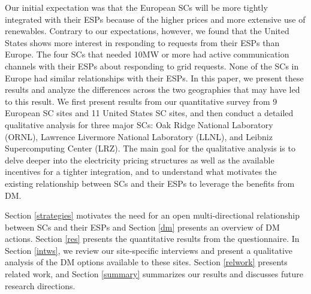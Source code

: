 Our initial expectation was that the European SCs will be more tightly integrated with their ESPs because of the higher prices and more extensive use of renewables.  Contrary to our expectations, however, we found that the United States shows more interest in responding to requests from their ESPs than Europe. The four SCs that needed 10MW or more had active communication channels with their ESPs about responding to grid requests.  None of the SCs in Europe had similar relationships with their ESPs. In this paper, we present these results and analyze the differences across the two geographies that may have led to this result. We first present results from our quantitative survey from 9 European SC sites and 11 United States SC sites, and then conduct a detailed qualitative analysis for three major SCs: Oak Ridge National Laboratory (ORNL), Lawrence Livermore National Laboratory (LLNL), and Leibniz Supercomputing Center (LRZ). The main goal for the qualitative analysis is to delve deeper into the electricity pricing structures as well as the available incentives for a tighter integration, and to understand what motivates the existing relationship between SCs and their ESPs to leverage the benefits from DM. 

Section \ref{strategies} motivates the need for an open multi-directional relationship between SCs and their ESPs and Section \ref{dm} presents an overview of DM actions. Section \ref{res} presents the quantitative results from the questionnaire. In Section \ref{intws}, we review our site-specific interviews and present a qualitative analysis of the DM options available to these sites. Section \ref{relwork} presents related work, and Section \ref{summary} summarizes our results and discusses future research directions.